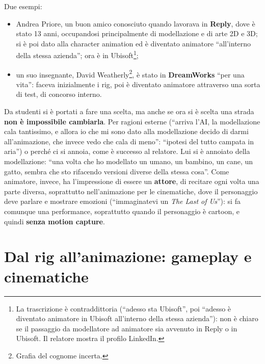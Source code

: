 Due esempi:
\begin{itemize}
  \item Andrea Priore, un buon amico conosciuto quando lavorava in
        \textbf{Reply}, dove è stato 13 anni, occupandosi principalmente di
        modellazione e di arte 2D e 3D; si è poi dato alla character
        animation ed è diventato animatore ``all'interno della stessa
        azienda''; ora è in Ubisoft\footnote{La trascrizione è contraddittoria
        (``adesso sta Ubisoft'', poi ``adesso è diventato animatore in
        Ubisoft all'interno della stessa azienda''): non è chiaro se il
        passaggio da modellatore ad animatore sia avvenuto in Reply o in
        Ubisoft. Il relatore mostra il profilo LinkedIn.};
  \item un suo insegnante, David Weatherly\footnote{Grafia del cognome
        incerta.}, è stato in \textbf{DreamWorks} ``per una vita'': faceva
        inizialmente i rig, poi è diventato animatore attraverso una sorta di
        test, di concorso interno.
\end{itemize}

Da studenti si è portati a fare una scelta, ma anche se ora si è scelta una
strada \textbf{non è impossibile cambiarla}. Per ragioni esterne (``arriva
l'AI, la modellazione cala tantissimo, e allora io che mi sono dato alla
modellazione decido di darmi all'animazione, che invece vedo che cala di
meno'': ``ipotesi del tutto campata in aria'') o perché ci si annoia, come è
successo al relatore. Lui si è annoiato della modellazione: ``una volta che
ho modellato un umano, un bambino, un cane, un gatto, sembra che sto rifacendo
versioni diverse della stessa cosa''. Come animatore, invece, ha
l'impressione di essere un \textbf{attore}, di recitare ogni volta una parte
diversa, soprattutto nell'animazione per le cinematiche, dove il personaggio
deve parlare e mostrare emozioni (``immaginatevi un \emph{The Last of
Us}''): si fa comunque una performance, soprattutto quando il personaggio è
cartoon, e quindi \textbf{senza motion capture}.

\section{Dal rig all'animazione: gameplay e cinematiche}
\label{p4:sec:animazioni}

